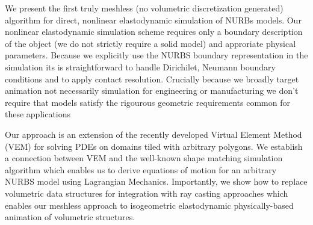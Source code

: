 We present the first truly meshless (no volumetric discretization generated) algorithm for direct, nonlinear elastodynamic simulation of NURBs models. 
Our nonlinear elastodynamic simulation scheme requires only a boundary description of the object (we do not strictly require a solid model) and
approriate physical parameters.  
Because we explicitly use the NURBS boundary representation in the simulation its is straightforward to handle
Dirichilet, Neumann boundary conditions and to apply contact resolution. 
Crucially because we broadly target animation not necessarily simulation for engineering or manufacturing we don't require that models
satisfy the rigourous geometric requirements common for these applications

Our approach is an extension of the recently developed Virtual Element Method (VEM) for solving PDEs on domains tiled with arbitrary polygons.
We establish a connection between VEM and the well-known shape matching simulation algorithm  which enables us 
to derive equations of motion for an arbitrary NURBS model using Lagrangian Mechanics. 
Importantly, we show how to replace volumetric data structures for integration with ray casting approaches which enables
our meshless approach to isogeometric elastodynamic physically-based animation of volumetric structures.

